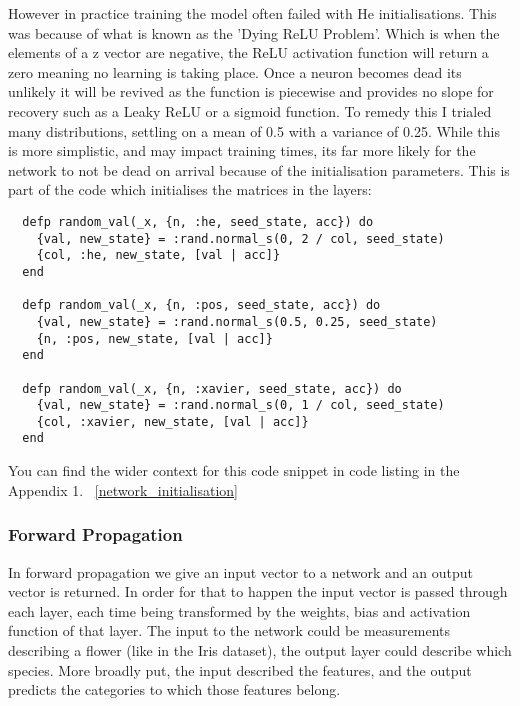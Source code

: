 However in practice training the model often failed with He initialisations.
This was because of what is known as the 'Dying ReLU Problem'. Which is when the
elements of a z vector are negative, the ReLU activation function
will return a zero meaning no learning is taking place. Once a neuron becomes
dead its unlikely it will be revived as the function is piecewise and provides
no slope for recovery such as a Leaky ReLU or a sigmoid function. To remedy this
I trialed many distributions, settling on a mean of 0.5 with a variance of 0.25.
While this is more simplistic, and may impact training times, its far more
likely for the network to not be dead on arrival because of the initialisation
parameters. This is part of the code which initialises the matrices in the layers:
\begin{lstlisting}
  defp random_val(_x, {n, :he, seed_state, acc}) do
    {val, new_state} = :rand.normal_s(0, 2 / col, seed_state)
    {col, :he, new_state, [val | acc]}
  end

  defp random_val(_x, {n, :pos, seed_state, acc}) do
    {val, new_state} = :rand.normal_s(0.5, 0.25, seed_state)
    {n, :pos, new_state, [val | acc]}
  end

  defp random_val(_x, {n, :xavier, seed_state, acc}) do
    {val, new_state} = :rand.normal_s(0, 1 / col, seed_state)
    {col, :xavier, new_state, [val | acc]}
  end
\end{lstlisting}
You can find the wider context for this code snippet in code listing in the Appendix 1. ~\ref{network_initialisation} 


\subsubsection{Forward Propagation}
In forward propagation we give an input vector to a network and an output vector
is returned. In order for that to happen the input vector is passed through each
layer, each time being transformed by the weights, bias and activation function
of that layer. The input to the network could be measurements describing a
flower (like in the Iris dataset), the output layer could describe which
species. More broadly put, the input described the features, and the output
predicts the categories to which those features belong.

